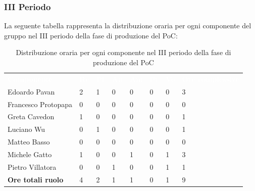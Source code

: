 \subsubsection{III Periodo}
La seguente tabella rappresenta la distribuzione oraria per ogni componente del gruppo nel III periodo della fase di produzione del PoC:
\begin{table}[!htbp]
\begin{center}
\renewcommand{\arraystretch}{1.25}
\begin{tabular}{ m{}<{\centering}  m{}<{\centering} m{}<{\centering} m{}<{\centering}  m{}<{\centering}  m{}<{\centering}  m{}<{\centering}  m{}<{\centering}   }
	\rowcolor{darkblue}
	\textcolor{white}{\textbf{Componente}} &\textcolor{white}{\textbf{Re}}&\textcolor{white}{\textbf{Pt}}&\textcolor{white}{\textbf{An}}&\textcolor{white}{\textbf{Am}}&\textcolor{white}{\textbf{Pr}}&\textcolor{white}{\textbf{Ve}}&\textcolor{white}{\textbf{Ore complessive}}\\ 
	Edoardo Pavan & 2 & 1 & 0 & 0 & 0 & 0 & 3 \\	
	
	Francesco Protopapa & 0 & 0 & 0 & 0 & 0 & 0 & 0 \\

	Greta Cavedon & 1 & 0 & 0 & 0 & 0 & 0 & 1 \\
	
	Luciano Wu & 0 & 1 & 0 & 0 & 0 & 0 & 1\\
	
	Matteo Basso & 0 & 0 & 0 & 0 & 0 & 0 & 0 \\
	
	Michele Gatto &  1 & 0 & 0 & 1 & 0 & 1 & 3\\
	
	Pietro Villatora & 0 & 0 & 1 & 0 & 0 & 1 & 1 \\
	
	\textbf{Ore totali ruolo} & 4 & 2 & 1 & 1 & 0 & 1 & 9\\

\end{tabular}
\caption{Distribuzione oraria per ogni componente nel III periodo della fase di produzione del PoC}
\end{center}
\end{table}

